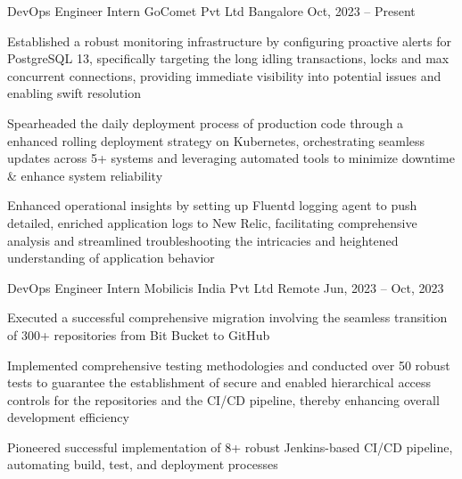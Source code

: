 \documentclass[]{awesome-cv}
\begin{document}
\begin{cventries}
    \cventry
    {DevOps Engineer Intern}
    {GoComet Pvt Ltd}
    {Bangalore}
    {Oct, 2023 – Present}
    {\begin{cvitems}
            \item {Established a robust monitoring infrastructure by configuring proactive alerts for PostgreSQL 13, specifically targeting the long idling transactions, locks and max concurrent connections, providing immediate visibility into potential issues and enabling swift resolution}
            \item {Spearheaded the daily deployment process of production code through a enhanced rolling deployment strategy on Kubernetes, orchestrating seamless updates across 5+ systems and leveraging automated tools to minimize downtime \& enhance system reliability}
            \item {Enhanced operational insights by setting up Fluentd logging agent to push detailed, enriched application logs to New Relic, facilitating comprehensive analysis and streamlined troubleshooting the intricacies and heightened understanding of application behavior}
        \end{cvitems}}
    \cventry
    {DevOps Engineer Intern}
    {Mobilicis India Pvt Ltd}
    {Remote}
    {Jun, 2023 – Oct, 2023}
    {\begin{cvitems}
            \item {Executed a successful comprehensive migration involving the seamless transition of 300+ repositories from Bit Bucket to GitHub}
            \item {Implemented comprehensive testing methodologies and conducted over 50 robust tests to guarantee the establishment of secure and enabled hierarchical access controls for the repositories and the CI/CD pipeline, thereby enhancing overall development efficiency}
            \item {Pioneered successful implementation of 8+ robust Jenkins-based CI/CD pipeline, automating build, test, and deployment processes}
        \end{cvitems}}

\end{cventries}
\end{document}
